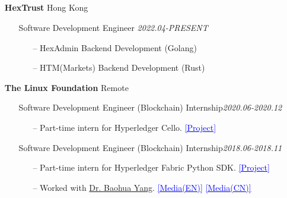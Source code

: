 \documentclass[11pt]{article}
\begin{document}
\subsection*{}
\begin{itemize}[leftmargin=0em, noitemsep, nolistsep]
    \setlength\itemsep{1em}
    \item[] \large\textbf{HexTrust} \hfill Hong Kong
    \begin{itemize}[noitemsep, nolistsep, leftmargin=0em]
        \item[] {Software Development Engineer} \hfill \textit{2022.04-PRESENT}
         \begin{itemize}
            \small
            \item[--] HexAdmin Backend Development (Golang)
            \item[--] HTM(Markets) Backend Development (Rust)
         \end{itemize}
    \end{itemize}
    \item[] \large\textbf{The Linux Foundation} \hfill Remote
        \begin{itemize}[noitemsep, nolistsep, leftmargin=0em]
            \item[] Software Development Engineer (Blockchain) Internship\hfill \textit{2020.06-2020.12}
            \begin{itemize}
                \small
                \item[--] Part-time intern for Hyperledger Cello. \href{https://github.com/hyperledger/cello}{\textcolor{blue}{[Project]}}
            \end{itemize}
            \item[] Software Development Engineer (Blockchain) Internship\hfill \textit{2018.06-2018.11}
             \begin{itemize}
                \small
                \item[--] Part-time intern for Hyperledger Fabric Python SDK. \href{https://github.com/hyperledger/fabric-sdk-py}{\textcolor{blue}{[Project]}}
                \item[--] Worked with \href{https://yeasy.github.io/}{Dr. Baohua Yang}. \href{https://www.hyperledger.org/blog/2018/06/13/meet-the-hyperledger-summer-2018-interns-part-2}{\textcolor{blue}{[Media(EN)]}} \href{https://archive.is/5nyBm}{\textcolor{blue}{[Media(CN)]}}
             \end{itemize}
        \end{itemize}


\end{itemize}
\end{document}
